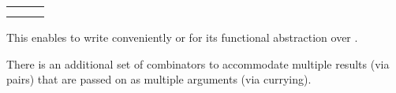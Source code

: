\begin{isabellebody}
\begin{isamarkuptext}
  \medskip
  \begin{tabular}{lll}
  \isa{x\ {\isaliteral{7C}{\isacharbar}}{\isaliteral{3E}{\isachargreater}}\ f} & \isa{{\isaliteral{5C3C65717569763E}{\isasymequiv}}} & \isa{f\ x} \\
  \isa{{\isaliteral{28}{\isacharparenleft}}f\ {\isaliteral{23}{\isacharhash}}{\isaliteral{3E}{\isachargreater}}\ g{\isaliteral{29}{\isacharparenright}}\ x} & \isa{{\isaliteral{5C3C65717569763E}{\isasymequiv}}} & \isa{x\ {\isaliteral{7C}{\isacharbar}}{\isaliteral{3E}{\isachargreater}}\ f\ {\isaliteral{7C}{\isacharbar}}{\isaliteral{3E}{\isachargreater}}\ g} \\
  \end{tabular}
  \medskip

  This enables to write conveniently  or
   for its functional abstraction over .

  \medskip There is an additional set of combinators to accommodate
  multiple results (via pairs) that are passed on as multiple
  arguments (via currying).


\end{isamarkuptext}
\end{isabellebody}
